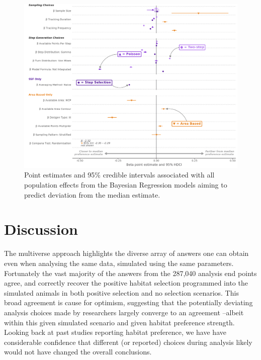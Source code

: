\documentclass[10pt,a4paper]{article}
\begin{document}
\begin{figure}
\includegraphics[width=1\linewidth]{../figures/_allEffectsPlot} \caption{Point estimates and 95\% credible intervals associated  with all population effects from the Bayesian Regression models aiming to predict deviation from the median estimate.}\label{fig:allEffectsPlot}
\end{figure}

\section{Discussion}\label{discussion}

The multiverse approach highlights the diverse array of answers one can obtain even when analysing the same data, simulated using the same parameters.
Fortunately the vast majority of the answers from the 287,040 analysis end points agree, and correctly recover the positive habitat selection programmed into the simulated animals in both positive selection and no selection scenarios.
This broad agreement is cause for optimism, suggesting that the potentially deviating analysis choices made by researchers largely converge to an agreement --albeit within this given simulated scenario and given habitat preference strength.
Looking back at past studies reporting habitat preference, we have have considerable confidence that different (or reported) choices during analysis likely would not have changed the overall conclusions.
\end{document}
